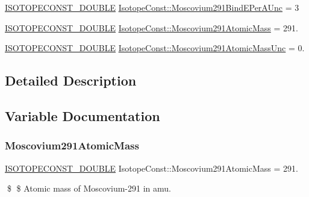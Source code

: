 \begin{DoxyCompactItemize}
\mbox{\hyperlink{group___isotope_const-_macros_ga8f45a7272ce02c0b4c65c44636ed719a}{I\+S\+O\+T\+O\+P\+E\+C\+O\+N\+S\+T\+\_\+\+D\+O\+U\+B\+LE}} \mbox{\hyperlink{group___isotope_const-_moscovium-_mc291_gaf3f0296499480731a3f3a9bc6fe742e1}{Isotope\+Const\+::\+Moscovium291\+Bind\+E\+Per\+A\+Unc}} = 3
\item 
\mbox{\hyperlink{group___isotope_const-_macros_ga8f45a7272ce02c0b4c65c44636ed719a}{I\+S\+O\+T\+O\+P\+E\+C\+O\+N\+S\+T\+\_\+\+D\+O\+U\+B\+LE}} \mbox{\hyperlink{group___isotope_const-_moscovium-_mc291_gaca3383501bc0a6c1d0025ff133eb7e3f}{Isotope\+Const\+::\+Moscovium291\+Atomic\+Mass}} = 291.
\item 
\mbox{\hyperlink{group___isotope_const-_macros_ga8f45a7272ce02c0b4c65c44636ed719a}{I\+S\+O\+T\+O\+P\+E\+C\+O\+N\+S\+T\+\_\+\+D\+O\+U\+B\+LE}} \mbox{\hyperlink{group___isotope_const-_moscovium-_mc291_gaf7e42e71159b1f41232e433d6f14b041}{Isotope\+Const\+::\+Moscovium291\+Atomic\+Mass\+Unc}} = 0.
\end{DoxyCompactItemize}


\subsection{Detailed Description}


\subsection{Variable Documentation}
\mbox{\label{group___isotope_const-_moscovium-_mc291_gaca3383501bc0a6c1d0025ff133eb7e3f}} 
\subsubsection{\texorpdfstring{Moscovium291\+Atomic\+Mass}{Moscovium291AtomicMass}}
{\footnotesize\ttfamily \mbox{\hyperlink{group___isotope_const-_macros_ga8f45a7272ce02c0b4c65c44636ed719a}{I\+S\+O\+T\+O\+P\+E\+C\+O\+N\+S\+T\+\_\+\+D\+O\+U\+B\+LE}} Isotope\+Const\+::\+Moscovium291\+Atomic\+Mass = 291.}

\$ \$ Atomic mass of Moscovium-\/291 in amu. \mbox{\label{group___isotope_const-_moscovium-_mc291_gaf7e42e71159b1f41232e433d6f14b041}} 

